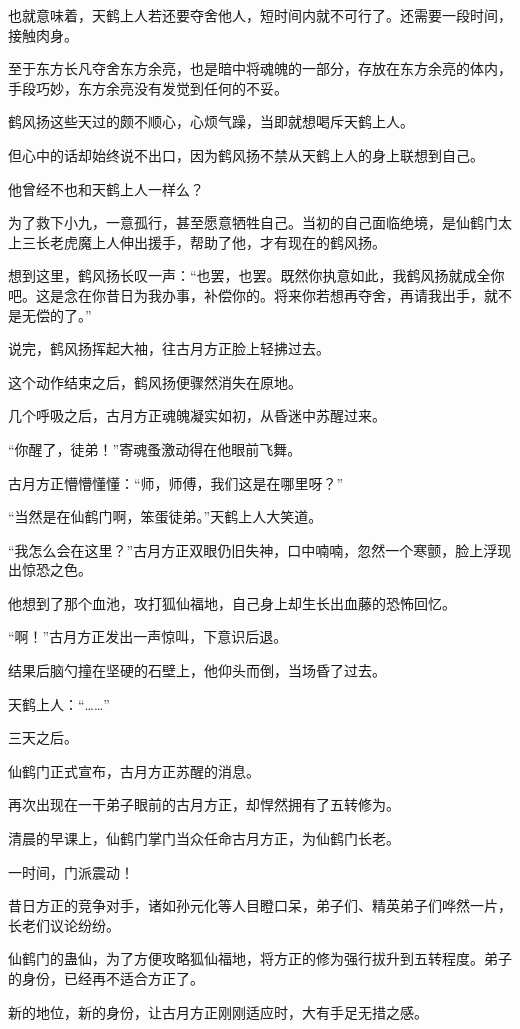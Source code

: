 \begin{this_body}
也就意味着，天鹤上人若还要夺舍他人，短时间内就不可行了。还需要一段时间，接触肉身。

至于东方长凡夺舍东方余亮，也是暗中将魂魄的一部分，存放在东方余亮的体内，手段巧妙，东方余亮没有发觉到任何的不妥。

鹤风扬这些天过的颇不顺心，心烦气躁，当即就想喝斥天鹤上人。

但心中的话却始终说不出口，因为鹤风扬不禁从天鹤上人的身上联想到自己。

他曾经不也和天鹤上人一样么？

为了救下小九，一意孤行，甚至愿意牺牲自己。当初的自己面临绝境，是仙鹤门太上三长老虎魔上人伸出援手，帮助了他，才有现在的鹤风扬。

想到这里，鹤风扬长叹一声：“也罢，也罢。既然你执意如此，我鹤风扬就成全你吧。这是念在你昔日为我办事，补偿你的。将来你若想再夺舍，再请我出手，就不是无偿的了。”

说完，鹤风扬挥起大袖，往古月方正脸上轻拂过去。

这个动作结束之后，鹤风扬便骤然消失在原地。

几个呼吸之后，古月方正魂魄凝实如初，从昏迷中苏醒过来。

“你醒了，徒弟！”寄魂蚤激动得在他眼前飞舞。

古月方正懵懵懂懂：“师，师傅，我们这是在哪里呀？”

“当然是在仙鹤门啊，笨蛋徒弟。”天鹤上人大笑道。

“我怎么会在这里？”古月方正双眼仍旧失神，口中喃喃，忽然一个寒颤，脸上浮现出惊恐之色。

他想到了那个血池，攻打狐仙福地，自己身上却生长出血藤的恐怖回忆。

“啊！”古月方正发出一声惊叫，下意识后退。

结果后脑勺撞在坚硬的石壁上，他仰头而倒，当场昏了过去。

天鹤上人：“……”

三天之后。

仙鹤门正式宣布，古月方正苏醒的消息。

再次出现在一干弟子眼前的古月方正，却悍然拥有了五转修为。

清晨的早课上，仙鹤门掌门当众任命古月方正，为仙鹤门长老。

一时间，门派震动！

昔日方正的竞争对手，诸如孙元化等人目瞪口呆，弟子们、精英弟子们哗然一片，长老们议论纷纷。

仙鹤门的蛊仙，为了方便攻略狐仙福地，将方正的修为强行拔升到五转程度。弟子的身份，已经再不适合方正了。

新的地位，新的身份，让古月方正刚刚适应时，大有手足无措之感。


\end{this_body}
